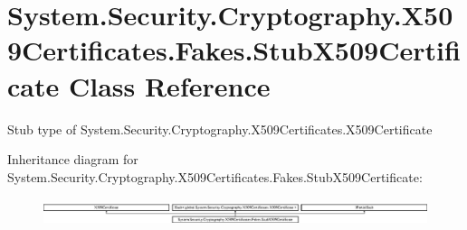 \hypertarget{class_system_1_1_security_1_1_cryptography_1_1_x509_certificates_1_1_fakes_1_1_stub_x509_certificate}{\section{System.\-Security.\-Cryptography.\-X509\-Certificates.\-Fakes.\-Stub\-X509\-Certificate Class Reference}
\label{class_system_1_1_security_1_1_cryptography_1_1_x509_certificates_1_1_fakes_1_1_stub_x509_certificate}
}


Stub type of System.\-Security.\-Cryptography.\-X509\-Certificates.\-X509\-Certificate 


Inheritance diagram for System.\-Security.\-Cryptography.\-X509\-Certificates.\-Fakes.\-Stub\-X509\-Certificate\-:\begin{figure}[H]
\begin{center}
\leavevmode
\includegraphics[height=0.789288cm]{class_system_1_1_security_1_1_cryptography_1_1_x509_certificates_1_1_fakes_1_1_stub_x509_certificate}
\end{center}
\end{figure}
